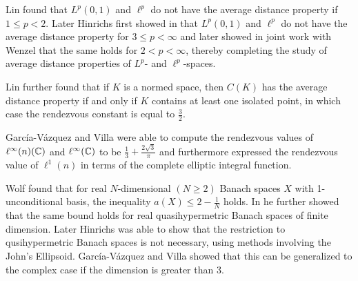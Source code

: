%
%

Lin \cite{lin} found that $L^p(0,1)$ and $\ell^p$ do not have the average distance property if $1\leq p<2$. Later Hinrichs first showed in \cite{hinrichs:banach1}that $L^p(0,1)$ and $\ell^p$ do not have the average distance property for $3\leq p<\infty$ and later showed in joint work with Wenzel \cite{hinrichs:banach2} that the same holds for $2<p<\infty$, thereby completing the study of average distance properties of $L^p$- and $\ell^p$-spaces.

Lin \cite{lin} further found that if $K$ is a normed space, then $C(K)$ has the average distance property if and only if $K$ contains at least one isolated point, in which case the rendezvous constant is equal to $\frac{3}{2}$.

García-Vázquez and Villa \cite{vazquez:l} were able to compute the rendezvous values of $\ell^\infty(n)(\mathbb{C})$ and $\ell^\infty(\mathbb{C})$ to be $\frac{1}{3}+\frac{2\sqrt{3}}{\pi}$ and furthermore expressed the rendezvous value of $\ell^1(n)$ in terms of the complete elliptic integral function.

Wolf \cite{wolf:finite-real-banach} found that for real $N$-dimensional $(N\geq 2)$ Banach spaces $X$ with 1-unconditional basis, the inequality $a(X)\leq 2-\frac{1}{N}$ holds. In \cite{wolf:quasihypermetric-banach} he further showed that the same bound holds for real quasihypermetric Banach spaces of finite dimension. Later Hinrichs \cite{hinrichs:johns-ellipsoid} was able to show that the restriction to qusihypermetric Banach spaces is not necessary, using methods involving the John's Ellipsoid. García-Vázquez and Villa \cite{vazquez:max-average} showed that this can be generalized to the complex case if the dimension is greater than 3.

